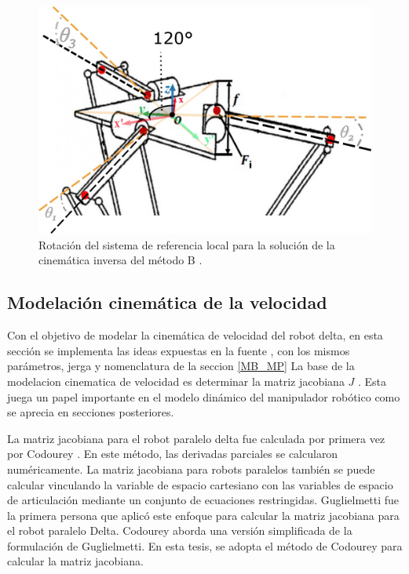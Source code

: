         \begin{figure}[htb]
                 \centering
               \includegraphics[width=1\linewidth]{Main/Chapter4/Images4/DIBUJO32.jpg}
               \caption{Rotación del sistema de referencia local para la solución de la cinemática
inversa del método B \cite{Path_Planning_and_Trajectory_Optimization}.}
               \label{f:f:Cap4_Metodo_B_Modelacion_Cinematica_Posicion_44}
            \end{figure}
        \newpage

\subsection{Modelación cinemática de la velocidad}\label{mb_cvel}
    
        Con el objetivo de modelar la cinemática de velocidad del robot delta, en esta sección se implementa las ideas expuestas en la fuente \cite{Path_Planning_and_Trajectory_Optimization},  con los mismos parámetros, jerga y nomenclatura de la seccion  \ref{MB_MP}
        La base de la modelacion cinematica de velocidad es determinar la matriz jacobiana  \( J \) . Esta juega un papel importante en el modelo dinámico del manipulador robótico como se aprecia en secciones posteriores.\par
        
        La matriz jacobiana para el robot paralelo delta fue calculada por primera vez por Codourey \cite{Codourey:31400}. En este método, las derivadas parciales se calcularon numéricamente. La matriz jacobiana para robots paralelos también se puede calcular vinculando la variable de espacio cartesiano con las variables de espacio de articulación mediante un conjunto de ecuaciones restringidas. Guglielmetti \cite{Guglielmetti:31706} fue la primera persona que aplicó este enfoque para calcular la matriz jacobiana para el robot paralelo Delta. Codourey \cite{DynamicCodourey} aborda una versión simplificada de la formulación de Guglielmetti. En esta tesis, se adopta el método de Codourey para calcular la matriz jacobiana.

